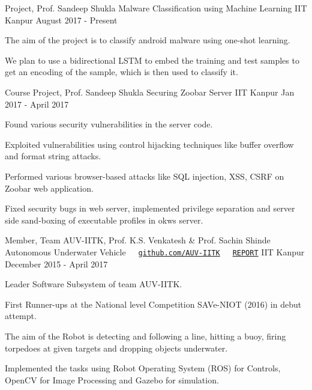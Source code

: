 \documentclass[12pt, a4paper]{awesome-cv}
\begin{document}

\begin{cventries}
  \cventry
    {Project, Prof. Sandeep Shukla}
    {Malware Classification using Machine Learning}
    {IIT Kanpur}
    {August 2017 - Present}
    {
      \begin{cvitems}
      \item The aim of the project is to classify android malware using one-shot learning.
      \item We plan to use a bidirectional LSTM to embed the training and test samples to get an encoding of the sample, which is then used to classify it.
      \end{cvitems}
    }
  \cventry
    {Course Project, Prof. Sandeep Shukla}
    {Securing Zoobar Server}
    {IIT Kanpur}
    {Jan 2017 - April 2017}
    {
      \begin{cvitems}
      \item Found various security vulnerabilities in the server code.
      \item Exploited vulnerabilities using control hijacking techniques like buffer overflow and format string attacks.
      \item Performed various browser-based attacks like SQL injection, XSS, CSRF on Zoobar web application.
      \item Fixed security bugs in web server, implemented privilege separation and server side sand-boxing of executable profiles in okws server.
      \end{cvitems}
    }
  \cventry
    {Member, Team AUV-IITK, Prof. K.S. Venkatesh \& Prof. Sachin Shinde}
    {Autonomous Underwater Vehicle\ \ \ \texttt{\href{https://github.com/AUV-IITK}{github.com/AUV-IITK}}\ \ \ \texttt{\href{https://drive.google.com/file/d/0B8_5kUnCr-WzbnRGV01lcEVTWDA/view?usp=sharing}{REPORT}} }
    {IIT Kanpur}
    {December 2015 - April 2017}
    {
      \begin{cvitems}
        \item {Leader Software Subsystem of team AUV-IITK.}
        \item {First Runner-ups at the National level Competition SAVe-NIOT (2016) in debut attempt.}
        \item {The aim of the Robot is detecting and following a line, hitting a buoy, firing torpedoes at given targets and dropping objects underwater.}
        \item {Implemented the tasks using Robot Operating System (ROS) for Controls, OpenCV for Image Processing and Gazebo for simulation.}        

\end{cvitems}}
\end{cventries}
\end{document}
